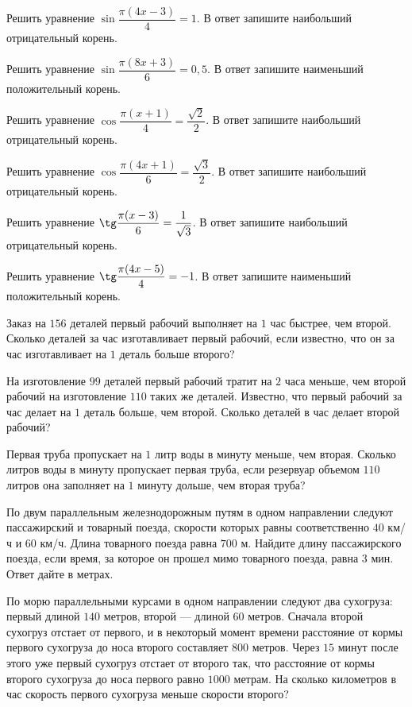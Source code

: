 \begin{homework}[number=2]
	\begin{listofex}
		\item Решить уравнение \( \sin\dfrac{\pi(4x-3)}{4}=1 \). В ответ запишите наибольший отрицательный корень.
		\item Решить уравнение \( \sin\dfrac{\pi(8x+3)}{6}=0,5 \). В ответ запишите наименьший положительный корень.
		\item Решить уравнение \( \cos\dfrac{\pi(x+1)}{4}=\dfrac{\sqrt{2}}{2} \). В ответ запишите наибольший отрицательный корень.
		\item Решить уравнение \( \cos\dfrac{\pi(4x+1)}{6}=\dfrac{\sqrt{3}}{2} \). В ответ запишите наибольший отрицательный корень.
		\item Решить уравнение \( \tg\dfrac{\pi(x-3)}{6}=\dfrac{1}{\sqrt{3}} \). В ответ запишите наибольший отрицательный корень.
		\item Решить уравнение \( \tg\dfrac{\pi(4x-5)}{4}=-1 \). В ответ запишите наименьший положительный корень.
		\item Заказ на \(156\) деталей первый рабочий выполняет на \(1\) час быстрее, чем второй. Сколько деталей за час изготавливает первый рабочий, если известно, что он за час изготавливает на \(1\) деталь больше второго?
		\item На изготовление \(99\) деталей первый рабочий тратит на \(2\) часа меньше, чем второй рабочий на изготовление \(110\) таких же деталей. Известно, что первый рабочий за час делает на \(1\) деталь больше, чем второй. Сколько деталей в час делает второй рабочий?
		\item Первая труба пропускает на \(1\) литр воды в минуту меньше, чем вторая. Сколько литров воды в минуту пропускает первая труба, если резервуар объемом \(110\) литров она заполняет на \(1\) минуту дольше, чем вторая труба?
		\item По двум параллельным железнодорожным путям в одном направлении следуют пассажирский и товарный поезда, скорости которых равны соответственно \(40\) км/ч и \(60\) км/ч. Длина товарного поезда равна \(700\) м. Найдите длину пассажирского поезда, если время, за которое он прошел мимо товарного поезда, равна \(3\) мин. Ответ дайте в метрах.
		\item По морю параллельными курсами в одном направлении следуют два сухогруза: первый длиной \(140\) метров, второй --- длиной \(60\) метров. Сначала второй сухогруз отстает от первого, и в некоторый момент времени расстояние от кормы первого сухогруза до носа второго составляет \(800\) метров. Через \(15\) минут после этого уже первый сухогруз отстает от второго так, что расстояние от кормы второго сухогруза до носа первого равно \(1000\) метрам. На сколько километров в час скорость первого сухогруза меньше скорости второго?
	\end{listofex}
\end{homework}

